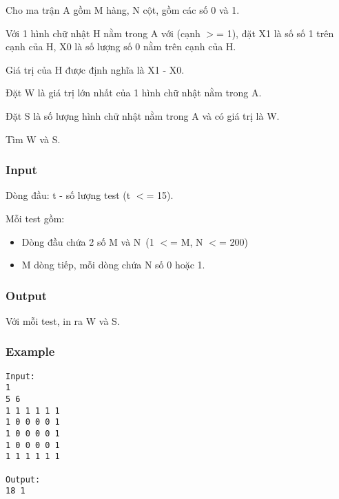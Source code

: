 

Cho ma trận A gồm M hàng, N cột, gồm các số 0 và 1.

Với 1 hình chữ nhật H nằm trong A với (cạnh $>$= 1), đặt X1 là số số 1 trên cạnh của H, X0 là số lượng số 0 nằm trên cạnh của H.

Giá trị của H được định nghĩa là X1 - X0.

Đặt W là giá trị lớn nhất của 1 hình chữ nhật nằm trong A.

Đặt S là số lượng hình chữ nhật nằm trong A và có giá trị là W.

Tìm W và S.

\subsubsection{Input}

Dòng đầu: t - số lượng test (t $<$= 15).

Mỗi test gồm:
\begin{itemize}
	\item Dòng đầu chứa 2 số M và N (1 $<$= M, N $<$= 200)
	\item M dòng tiếp, mỗi dòng chứa N số 0 hoặc 1.
\end{itemize}

\subsubsection{Output}

Với mỗi test, in ra W và S.

\subsubsection{Example}
\begin{verbatim}
Input:
1
5 6
1 1 1 1 1 1
1 0 0 0 0 1
1 0 0 0 0 1
1 0 0 0 0 1
1 1 1 1 1 1

Output:
18 1
\end{verbatim}